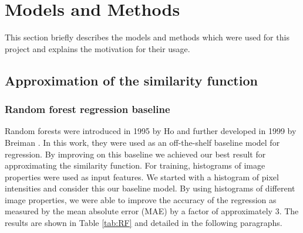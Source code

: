 \documentclass[10pt,conference,compsocconf]{IEEEtran}
\begin{document}


\section{Models and Methods} \label{sec:models_methods}
This section briefly describes the models and methods which were used for this project and explains the motivation for their usage. 

\subsection{Approximation of the similarity function}

\subsubsection{Random forest regression baseline} 
Random forests were introduced in 1995 by Ho \cite{Ho} and further developed in 1999 by Breiman \cite{Breiman}. In this work, they were used as an off-the-shelf baseline model for regression. By improving on this baseline we achieved our best result for approximating the similarity function. For training, histograms of image properties were used as input features. We started with a histogram of pixel intensities and consider this our baseline model. By using histograms of different image properties, we were able to improve the accuracy of the regression as measured by the mean absolute error (MAE) by a factor of approximately 3. The results are shown in Table \ref{tab:RF} and detailed in the following paragraphs.
\end{document}
